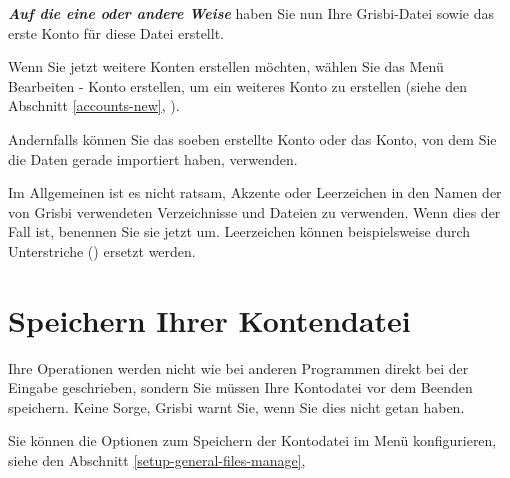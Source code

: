 \begin{enumerate}
\label{start-newfile-end}

\textit{\textbf{Auf die eine oder andere Weise}} haben Sie nun Ihre Grisbi-Datei sowie das erste Konto für diese Datei erstellt.%


Wenn Sie jetzt weitere Konten erstellen möchten, wählen Sie das Menü {Bearbeiten - Konto erstellen}, um ein weiteres Konto zu erstellen (siehe den Abschnitt \vref{accounts-new}, ).%


Andernfalls können Sie das soeben erstellte Konto oder das Konto, von dem Sie die Daten gerade importiert haben, verwenden.%

Im Allgemeinen ist es nicht ratsam, Akzente oder Leerzeichen in den Namen der von Grisbi verwendeten Verzeichnisse und Dateien zu verwenden. Wenn dies der Fall ist, benennen Sie sie jetzt um. Leerzeichen können beispielsweise durch Unterstriche (\underline{}) ersetzt werden.%

\section{Speichern Ihrer Kontendatei\label{start-save}}%

Ihre Operationen werden nicht wie bei anderen Programmen direkt bei der Eingabe geschrieben, sondern Sie müssen Ihre Kontodatei vor dem Beenden speichern. Keine Sorge, Grisbi warnt Sie, wenn Sie dies nicht getan haben.%

Sie können die Optionen zum Speichern der Kontodatei im Menü  konfigurieren, siehe den Abschnitt \vref{setup-general-files-manage}, %



\end{enumerate}
